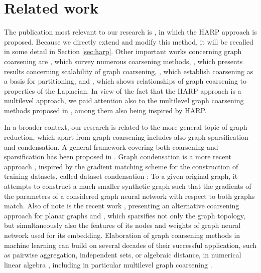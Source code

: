 \section{Related work}

The publication most relevant to our research is \cite{chen_harp_2018}, in which the HARP approach is proposed. Because we directly extend and modify this method, it will be recalled in some detail in Section \ref{sec:harp}. Other important works concerning graph coarsening are \cite{akyildiz_understanding_2020,cai_graph_2022,chen_graph_2022}, which survey numerous coarsening methods, \cite{huang_scaling_2021}, which presents results concerning scalability of graph coarsening, \cite{catalyurek_multithreaded_2012,herrmann_multilevel_2019}, which establish coarsening as a basis for partitioning, and \cite{loukas_graph_2019}, which shows relationships of graph coarsening to properties of the Laplacian. In view of the fact that the HARP approach is a multilevel approach, we paid attention also to the multilevel graph coarsening methods proposed in \cite{bethune_hierarchical_2020,liu_hierarchical_2021,xie_graph_2020,zhang_harp_2021}, among them \cite{zhang_harp_2021} also being inspired by HARP.

In a broader context, our research is related to the more general topic of graph reduction, which apart from graph coarsening includes also graph sparsification and condensation. A general framework covering both coarsening and sparsification has been proposed in \cite{bravo_hermsdorff_unifying_2019}. Graph condensation is a more recent approach \cite{jin_condensing_2022,jin_graph_2022}, inspired by the gradient matching scheme for the construction of training datasets, called dataset condensation \cite{zhao_dataset_2021}: To a given original graph, it attempts to construct a much smaller synthetic graph such that the gradients of the parameters of a considered graph neural network with respect to both graphs match. Also of note is the recent work \cite{kammer_space-efficient_2022}, presenting an alternative coarsening approach for planar graphs and \cite{liu_comprehensive_2022}, which sparsifies not only the graph topology, but simultaneously also the features of its nodes and weights of graph neural network used for its embedding. Elaboration of graph coarsening methods in machine learning can build on several decades of their successful application, such as pairwise aggregation, independent sets, or algebraic distance, in numerical linear algebra \cite{chen_graph_2022}, including in particular multilevel graph coarsening \cite{osei-kuffuor_matrix_2015,ubaru_sampling_2019}.

